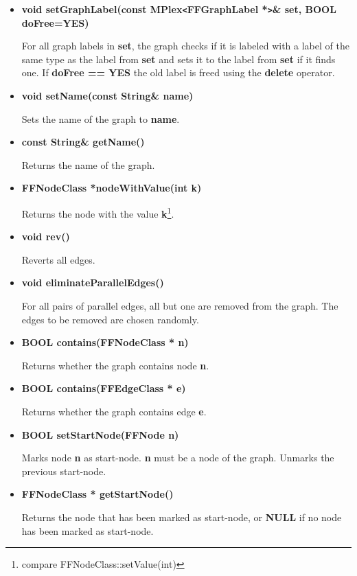 \begin{itemize}
\item{\bf void setGraphLabel(const MPlex\verb|<|FFGraphLabel
    *\verb|>|\& set, BOOL doFree=YES)}
    
  For all graph labels in {\bf set}, the graph checks if it is
  labeled with a label of the same type as the label from {\bf
    set} and sets it to the label from {\bf set} if it finds one.
  If {\bf doFree == YES} the old label is freed using the {\bf
    delete} operator.
    
\item{\bf void setName(const String\& name)}

Sets the name of the graph to {\bf name}.

\item{\bf const String\& getName()}

Returns the name of the graph.
  
\item{\bf FFNodeClass *nodeWithValue(int k)}
  
  Returns the node with the value {\bf k}\footnote{compare
    FFNodeClass::setValue(int)}.
      
\item{\bf void rev()}

Reverts all edges.

\item{\bf void eliminateParallelEdges()}
  
  For all pairs of parallel edges, all but one are removed from
  the graph.  The edges to be removed are chosen randomly.

\item{\bf BOOL contains(FFNodeClass * n)}

Returns whether the graph contains node {\bf n}.

\item{\bf BOOL contains(FFEdgeClass * e)}

Returns whether the graph contains edge {\bf e}.

\item{\bf BOOL setStartNode(FFNode n)}
  
  Marks node {\bf n} as start-node. {\bf n} must be a node of the
  graph.  Unmarks the previous start-node.

\item{\bf FFNodeClass * getStartNode()}
  
  Returns the node that has been marked as start-node, or {\bf
    NULL} if no node has been marked as start-node.
  

\end{itemize}
